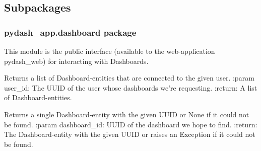 \documentclass[letterpaper,10pt,english]{sphinxmanual}
\begin{document}
\subsection{Subpackages}
\label{\detokenize{pydash_app:subpackages}}

\subsubsection{pydash\_app.dashboard package}
\label{\detokenize{pydash_app.dashboard:module-pydash_app.dashboard}}\label{\detokenize{pydash_app.dashboard:pydash-app-dashboard-package}}\label{\detokenize{pydash_app.dashboard::doc}}
This module is the public interface (available to the web-application pydash\_web)
for interacting with Dashboards.

\begin{fulllineitems}
\label{\detokenize{pydash_app.dashboard:pydash_app.dashboard.add_to_repository}}
\end{fulllineitems}


\begin{fulllineitems}
\label{\detokenize{pydash_app.dashboard:pydash_app.dashboard.dashboards_of_user}}
Returns a list of Dashboard-entities that are connected to the given user.
:param user\_id: The UUID of the user whose dashboards we’re requesting.
:return: A list of Dashboard-entities.

\end{fulllineitems}


\begin{fulllineitems}
\label{\detokenize{pydash_app.dashboard:pydash_app.dashboard.find}}
Returns a single Dashboard-entity with the given UUID or None if it could not be found.
:param dashboard\_id: UUID of the dashboard we hope to find.
:return: The Dashboard-entity with the given UUID or raises an Exception if it could not be found.

\end{fulllineitems}
\end{document}
